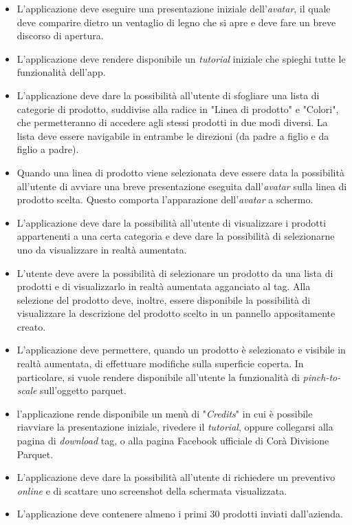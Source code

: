 \begin{itemize}
	
	\item L'applicazione deve eseguire una presentazione iniziale dell'\textit{avatar\gloss}, il quale deve comparire dietro un ventaglio di legno che si apre e deve fare un breve discorso di apertura.
	
	\item L'applicazione deve rendere disponibile un \textit{tutorial} iniziale che spieghi tutte le funzionalit\`a dell'app.
	
	\item L'applicazione deve dare la possibilit\`a all'utente di sfogliare una lista di categorie di prodotto, suddivise alla radice in  "Linea di prodotto" e "Colori", che permetteranno di accedere agli stessi prodotti in due modi diversi. La lista deve essere navigabile in entrambe le direzioni (da padre a figlio e da figlio a padre).
	
	\item Quando una linea di prodotto viene selezionata deve essere data la possibilit\`a all'utente di avviare una breve presentazione eseguita dall'\textit{avatar\gloss} sulla linea di prodotto scelta. Questo comporta l'apparazione dell'\textit{avatar\gloss} a schermo.
	
	\item L'applicazione deve dare la possibilit\`a all'utente di visualizzare i prodotti appartenenti a una certa categoria e deve dare la possibilit\`a di selezionarne uno da visualizzare in realt\`a aumentata.
	
	\item L'utente deve avere la possibilit\`a di selezionare un prodotto da una lista di prodotti e di visualizzarlo in realt\`a aumentata agganciato al tag. Alla selezione del prodotto deve, inoltre, essere disponibile la possibilit\`a di visualizzare la descrizione del prodotto scelto in un pannello appositamente creato.
	
	\item L'applicazione deve permettere, quando un prodotto \`e selezionato e visibile in realt\`a aumentata, di effettuare modifiche sulla superficie coperta. In particolare, si vuole rendere disponibile all'utente la funzionalit\`a di \textit{pinch-to-scale} sull'oggetto parquet.
	
	\item l'applicazione rende disponibile un men\`u di "\textit{Credits}" in cui \`e possibile riavviare la presentazione iniziale, rivedere il \textit{tutorial}, oppure collegarsi alla pagina di \textit{download} tag, o alla pagina Facebook ufficiale di Cor\`a Divisione Parquet.
	
	\item L'applicazione deve dare la possibilit\`a all'utente di richiedere un preventivo \textit{online} e di scattare uno screenshot della schermata visualizzata.
	
	\item L'applicazione deve contenere almeno i primi 30 prodotti inviati dall'azienda. 
	
\end{itemize}

